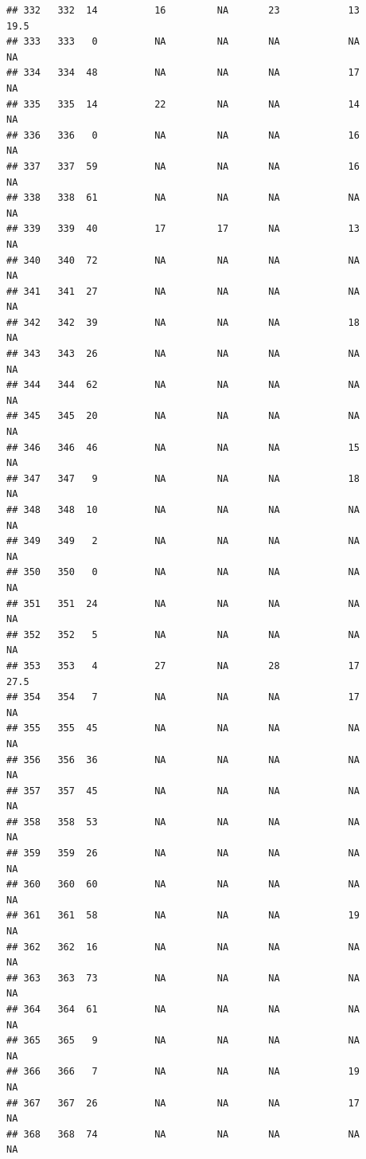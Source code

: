 \documentclass[man]{apa6}
\begin{document}
\begin{verbatim}
## 332   332  14          16         NA       23            13     19.5
## 333   333   0          NA         NA       NA            NA       NA
## 334   334  48          NA         NA       NA            17       NA
## 335   335  14          22         NA       NA            14       NA
## 336   336   0          NA         NA       NA            16       NA
## 337   337  59          NA         NA       NA            16       NA
## 338   338  61          NA         NA       NA            NA       NA
## 339   339  40          17         17       NA            13       NA
## 340   340  72          NA         NA       NA            NA       NA
## 341   341  27          NA         NA       NA            NA       NA
## 342   342  39          NA         NA       NA            18       NA
## 343   343  26          NA         NA       NA            NA       NA
## 344   344  62          NA         NA       NA            NA       NA
## 345   345  20          NA         NA       NA            NA       NA
## 346   346  46          NA         NA       NA            15       NA
## 347   347   9          NA         NA       NA            18       NA
## 348   348  10          NA         NA       NA            NA       NA
## 349   349   2          NA         NA       NA            NA       NA
## 350   350   0          NA         NA       NA            NA       NA
## 351   351  24          NA         NA       NA            NA       NA
## 352   352   5          NA         NA       NA            NA       NA
## 353   353   4          27         NA       28            17     27.5
## 354   354   7          NA         NA       NA            17       NA
## 355   355  45          NA         NA       NA            NA       NA
## 356   356  36          NA         NA       NA            NA       NA
## 357   357  45          NA         NA       NA            NA       NA
## 358   358  53          NA         NA       NA            NA       NA
## 359   359  26          NA         NA       NA            NA       NA
## 360   360  60          NA         NA       NA            NA       NA
## 361   361  58          NA         NA       NA            19       NA
## 362   362  16          NA         NA       NA            NA       NA
## 363   363  73          NA         NA       NA            NA       NA
## 364   364  61          NA         NA       NA            NA       NA
## 365   365   9          NA         NA       NA            NA       NA
## 366   366   7          NA         NA       NA            19       NA
## 367   367  26          NA         NA       NA            17       NA
## 368   368  74          NA         NA       NA            NA       NA

\end{verbatim}
\end{document}
